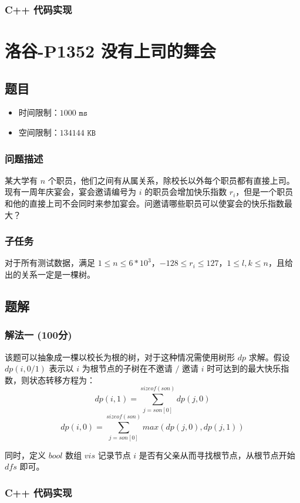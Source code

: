 \documentclass[UTF8, 12pt, a4paper, oneside]{ctexart}
\begin{document}
\subsubsection{C++ 代码实现}


\section{洛谷-P1352 没有上司的舞会}
\subsection{题目}
\begin{itemize}
    \item 时间限制：$1000\texttt{ ms}$
    \item 空间限制：$134144\texttt{ KB}$
\end{itemize}
\subsubsection{问题描述}
\par 某大学有 $n$ 个职员，他们之间有从属关系，除校长以外每个职员都有直接上司。现有一周年庆宴会，宴会邀请编号为 $i$ 的职员会增加快乐指数 $r_i$，但是一个职员和他的直接上司不会同时来参加宴会。问邀请哪些职员可以使宴会的快乐指数最大？
\subsubsection{子任务}
\par 对于所有测试数据，满足 $1 \leq n \leq 6*10^3$，$-128 \leq r_i \leq 127$，$1 \leq l, k \leq n$，且给出的关系一定是一棵树。
\subsection{题解}
\subsubsection{解法一 (100分)}
\par 该题可以抽象成一棵以校长为根的树，对于这种情况需使用树形 $dp$ 求解。假设 $dp(i, 0/1)$ 表示以 $i$ 为根节点的子树在不邀请 $/$ 邀请 $i$ 时可达到的最大快乐指数，则状态转移方程为：$$dp(i, 1) = \sum_{j = son[0]}^{sizeof(son)} dp(j, 0)$$ $$dp(i, 0) = \sum_{j = son[0]}^{sizeof(son)} max(dp(j, 0), dp(j, 1))$$
\par 同时，定义 $bool$ 数组 $vis$ 记录节点 $i$ 是否有父亲从而寻找根节点，从根节点开始 $dfs$ 即可。
\subsubsection{C++ 代码实现}

\end{document}
